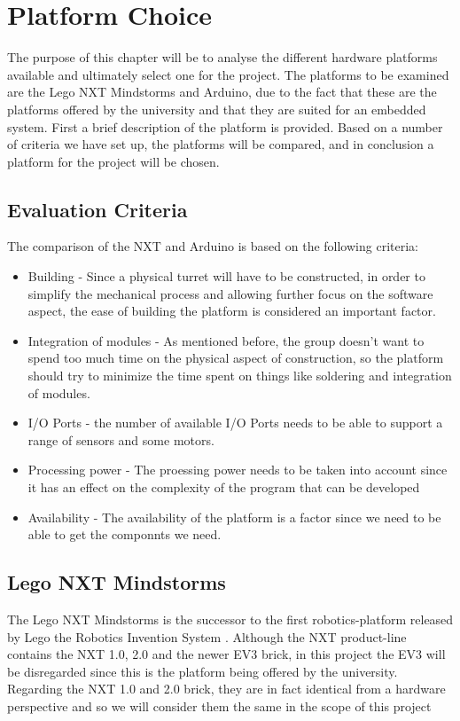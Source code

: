 \chapter{Platform Choice}\label{PlatformC}

The purpose of this chapter will be to analyse the different hardware platforms available
and ultimately select one for the project. The platforms to be examined are the
Lego NXT Mindstorms and Arduino, due to the fact that these are the
platforms offered by the university and that they are suited for an embedded
system.
First a brief description of the platform is provided. Based on a number of criteria
 we have set up, the platforms will be compared, and in conclusion a
platform for the project will be chosen.

\section{Evaluation Criteria}
The comparison of the NXT and Arduino is based on the following criteria:

\begin{itemize}
  \item Building - Since a physical turret will have to be constructed, in
  order to simplify the mechanical process and allowing further focus on the
  software aspect, the ease of building the platform is considered an important factor.
  \item Integration of modules - As mentioned before, the group doesn't want to spend too
  much time on the physical aspect of construction, so the platform should try to minimize
  the time spent on things like soldering and integration of modules.
  \item I/O Ports - the number of available I/O Ports needs to be able to
  support a range of sensors and some motors.
  \item Processing power - The proessing power needs to be taken into account
  since it has an effect on the complexity of the program that can be developed
  \item Availability - The availability of the platform is a factor since we
  need to be able to get the componnts we need.
\end{itemize}

\section{Lego NXT Mindstorms}
The Lego NXT Mindstorms is the successor to the first robotics-platform released
by Lego the Robotics Invention System \citep{NXTHistory}. Although the NXT
product-line contains the NXT 1.0, 2.0 and the newer EV3 brick, in this project
the EV3 will be disregarded since this is the platform being offered by the
university. Regarding the NXT 1.0 and 2.0 brick, they are in fact identical from
a hardware perspective and so we will consider them the same in the scope of
this project \citep{NXTversions}\nl

